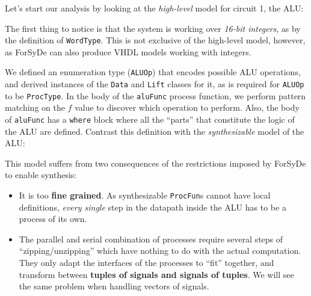 \documentclass[a4paper]{article}
\begin{document}
                Let's start our analysis by looking at the \emph{high-level} model for circuit 1,
                the ALU:

                The first thing to notice is that the system is working over \emph{16-bit integers},
                as by the definition of \texttt{WordType}. This is not exclusive of the high-level
                model, however, as ForSyDe can also produce VHDL models working with integers.

                We defined an enumeration type (\texttt{ALUOp}) that encodes possible ALU
                operations, and derived instances of the \texttt{Data} and \texttt{Lift} classes for
                it, as is required for \texttt{ALUOp} to be \texttt{ProcType}. In the body of the
                \texttt{aluFunc} process function, we perform pattern matching on the $f$ value to
                discover which operation to perform. Also, the body of \texttt{aluFunc} has a
                \texttt{where} block where all the ``parts'' that constitute the logic of the ALU
                are defined. Contrast this definition with the \emph{synthesizable} model of the
                ALU:


                This model suffers from two consequences of the restrictions imposed by ForSyDe to
                enable synthesis:

                \begin{itemize}
                    \item It is too \textbf{fine grained}. As synthesizable \texttt{ProcFun}s cannot
                        have local definitions, \emph{every single} step in the datapath inside the
                        ALU has to be a process of its own.

                    \item The parallel and serial combination of processes require several steps of
                        ``zipping/unzipping'' which have nothing to do with the actual computation.
                        They only adapt the interfaces of the processes to ``fit'' together, and
                        transform between \textbf{tuples of signals and signals of tuples}. We will
                        see the same problem when handling vectors of signals.
                \end{itemize}
\end{document}
